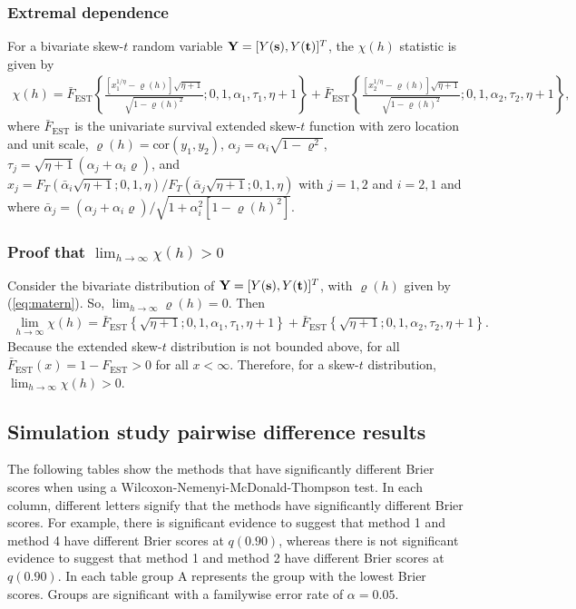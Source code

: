 \documentclass[11pt]{article}
\begin{document}
\subsubsection*{Extremal dependence}
For a bivariate skew-$t$ random variable $\mbox{\bf Y} = [Y(\mbox{\bf s}), Y(\mbox{\bf t})]^T$, the $\chi(h)$ statistic \citep{Padoan2011} is given by
\begin{align}
  \chi(h) = \bar{F}_{\text{EST}}\left\{ \frac{[x_1^{1 / \eta} - \varrho(h)] \sqrt{\eta + 1} }{\sqrt{1 - \varrho(h)^2}}; 0, 1, \alpha_1, \tau_1, \eta + 1 \right\} + \bar{F}_{\text{EST}}\left\{ \frac{ [x_2^{1 / \eta} - \varrho(h)] \sqrt{\eta + 1} }{ \sqrt{1 - \varrho(h)^2} }; 0, 1, \alpha_2, \tau_2, \eta + 1 \right\},
\end{align}
where $\bar{F}_{\text{EST}}$ is the univariate survival extended skew-$t$ function with zero location and unit scale, \hbox{$\varrho(h) = \text{cor}(y_1, y_2)$}, $\alpha_j = \alpha_i \sqrt{1 - \varrho^2}$, $\tau_j = \sqrt{\eta + 1}(\alpha_j + \alpha_i \varrho)$, and $x_j = F_T(\bar{\alpha}_i \sqrt{\eta + 1}; 0, 1, \eta) / F_T(\bar{\alpha}_j \sqrt{\eta + 1}; 0, 1, \eta)$ with $j = 1, 2$ and $i = 2, 1$ and where $\bar{\alpha}_j = (\alpha_j + \alpha_i \varrho) / \sqrt{ 1 + \alpha_i^2 [1 - \varrho(h)^2]}$.

\subsubsection*{Proof that $\lim_{h \rightarrow \infty} \chi(h) > 0$}
Consider the bivariate distribution of $\mbox{\bf Y} = [Y(\mbox{\bf s}), Y(\mbox{\bf t})]^T$, with $\varrho(h)$ given by (\ref{eq:matern}).
So, $\lim_{h \rightarrow \infty} \varrho(h) = 0$.
Then
\begin{align}
  \lim_{h \rightarrow \infty} \chi(h) = \bar{F}_{\text{EST}}\left\{ \sqrt{\eta + 1}; 0, 1, \alpha_1, \tau_1, \eta + 1 \right\} + \bar{F}_{\text{EST}}\left\{ \sqrt{\eta + 1}; 0, 1, \alpha_2, \tau_2, \eta + 1 \right\}.
\end{align}
Because the extended skew-$t$ distribution is not bounded above, for all $\bar{F}_{\text{EST}}(x) = 1 - F_{\text{EST}} > 0$ for all $x < \infty$.
Therefore, for a skew-$t$ distribution, $\lim_{h \rightarrow \infty} \chi(h) > 0$.

\subsection{Simulation study pairwise difference results} \label{a:pdiffs}
The following tables show the methods that have significantly different Brier scores when using a Wilcoxon-Nemenyi-McDonald-Thompson test.
In each column, different letters signify that the methods have significantly different Brier scores.
For example, there is significant evidence to suggest that method 1 and method 4 have  different Brier scores at $q(0.90)$, whereas there is not significant evidence to suggest that method 1 and method 2 have different Brier scores at $q(0.90)$.
In each table group A represents the group with the lowest Brier scores.
Groups are significant with a familywise error rate of $\alpha = 0.05$.
\end{document}
